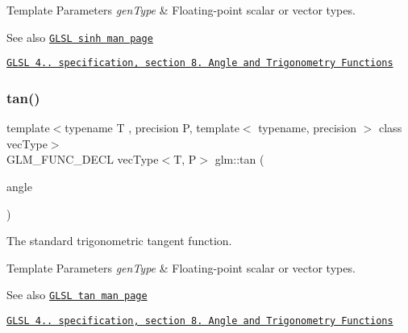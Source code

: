 \begin{DoxyTemplParams}{Template Parameters}
{\em gen\+Type} & Floating-\/point scalar or vector types.\\
\hline
\end{DoxyTemplParams}
\begin{DoxySeeAlso}{See also}
\href{http://www.opengl.org/sdk/docs/manglsl/xhtml/sinh.xml}{\tt G\+L\+SL sinh man page} 

\href{http://www.opengl.org/registry/doc/GLSLangSpec.4.20.8.pdf}{\tt G\+L\+SL 4.. specification, section 8. Angle and Trigonometry Functions} 
\end{DoxySeeAlso}
\mbox{\label{group__core__func__trigonometric_gab3ae890c38b7d3aa4d5e00998fd296b2}} 
\subsubsection{\texorpdfstring{tan()}{tan()}}
{\footnotesize\ttfamily template$<$typename T , precision P, template$<$ typename, precision $>$ class vec\+Type$>$ \\
G\+L\+M\+\_\+\+F\+U\+N\+C\+\_\+\+D\+E\+CL vec\+Type$<$T, P$>$ glm\+::tan (\begin{DoxyParamCaption}\item[{vec\+Type$<$ T, P $>$ const \&}]{angle }\end{DoxyParamCaption})}

The standard trigonometric tangent function.


\begin{DoxyTemplParams}{Template Parameters}
{\em gen\+Type} & Floating-\/point scalar or vector types.\\
\hline
\end{DoxyTemplParams}
\begin{DoxySeeAlso}{See also}
\href{http://www.opengl.org/sdk/docs/manglsl/xhtml/tan.xml}{\tt G\+L\+SL tan man page} 

\href{http://www.opengl.org/registry/doc/GLSLangSpec.4.20.8.pdf}{\tt G\+L\+SL 4.. specification, section 8. Angle and Trigonometry Functions} 
\end{DoxySeeAlso}
\mbox{\label{group__core__func__trigonometric_ga234e904a0075f88654a594b5f837711f}} 
